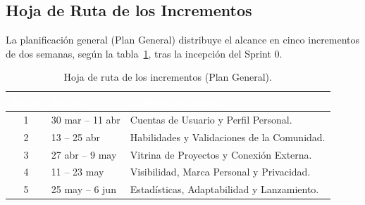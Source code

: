 \subsection{Hoja de Ruta de los Incrementos}
\label{ssec:s0_roadmap}
La planificación general (Plan General) distribuye el alcance en cinco incrementos de dos
semanas, según la tabla~\ref{tab:s0_roadmap}, tras la incepción del Sprint 0.

\begin{table}[!ht]
    \centering
    \renewcommand{\arraystretch}{1.3}
    \fontsize{9}{10.8}\selectfont\sffamily
    \begin{tabularx}{\textwidth}{|c|l|X|}
        \hline
        \rowcolor{colorPrimario}
        \textcolor{white}{\textbf{Sprint}} & \textcolor{white}{\textbf{Periodo}} & \textcolor{white}{\textbf{Módulo entregado}} \\ \hline
        1 & 30 mar -- 11 abr & Cuentas de Usuario y Perfil Personal. \\ \hline
        \rowcolor{grisTecnico}
        2 & 13 -- 25 abr & Habilidades y Validaciones de la Comunidad. \\ \hline
        3 & 27 abr -- 9 may & Vitrina de Proyectos y Conexión Externa. \\ \hline
        \rowcolor{grisTecnico}
        4 & 11 -- 23 may & Visibilidad, Marca Personal y Privacidad. \\ \hline
        5 & 25 may -- 6 jun & Estadísticas, Adaptabilidad y Lanzamiento. \\ \hline
    \end{tabularx}
    \caption{Hoja de ruta de los incrementos (Plan General).}
    \label{tab:s0_roadmap}
\end{table}

\clearpage
